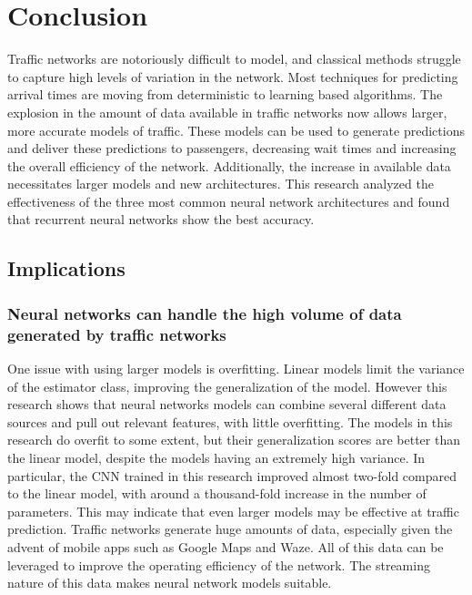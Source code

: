 \chapter{Conclusion}

Traffic networks are notoriously difficult to model, and classical methods struggle to capture high levels of variation in the network.
Most techniques for predicting arrival times are moving from deterministic to learning based algorithms.
The explosion in the amount of data available in traffic networks now allows larger, more accurate models of traffic.
These models can be used to generate predictions and deliver these predictions to passengers, decreasing wait times and increasing the overall efficiency of the network.
Additionally, the increase in available data necessitates larger models and new architectures.
This research analyzed the effectiveness of the three most common neural network architectures and found that recurrent neural networks show the best accuracy.

\section{Implications}

\subsection{Neural networks can handle the high volume of data generated by traffic networks}

One issue with using larger models is overfitting.
Linear models limit the variance of the estimator class, improving the generalization of the model.
However this research shows that neural networks models can combine several different data sources and pull out relevant features, with little overfitting.
The models in this research do overfit to some extent, but their generalization scores are better than the linear model, despite the models having an extremely high variance.
In particular, the CNN trained in this research improved almost two-fold compared to the linear model, with around a thousand-fold increase in the number of parameters.
This may indicate that even larger models may be effective at traffic prediction.
Traffic networks generate huge amounts of data, especially given the advent of mobile apps such as Google Maps and Waze.
All of this data can be leveraged to improve the operating efficiency of the network.
The streaming nature of this data makes neural network models suitable.

